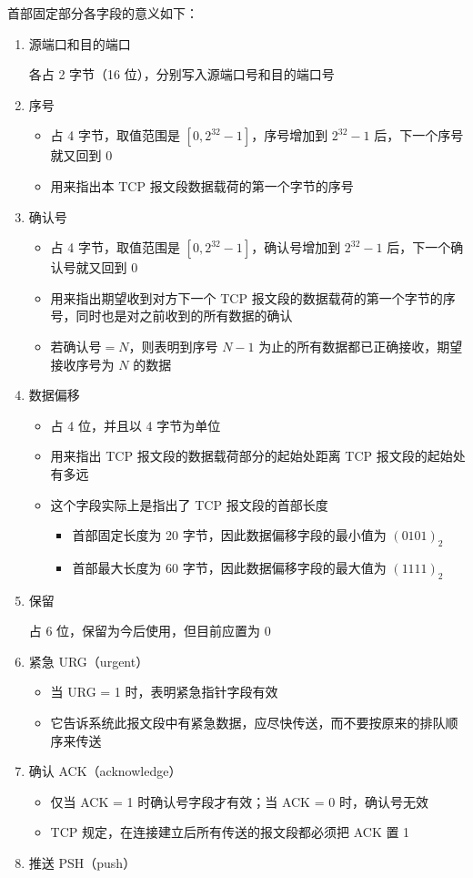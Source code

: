 \documentclass[cs4size,a4paper,10pt]{ctexart}
\begin{document}
	首部固定部分各字段的意义如下：
	\begin{enumerate}[label=\arabic*.]
		\item 源端口和目的端口
		
		各占 2 字节（16 位），分别写入源端口号和目的端口号
		\item 序号
		\begin{itemize}
			\item 占 4 字节，取值范围是 $[0,2^{32} - 1]$，序号增加到 $2^{32}-1$ 后，下一个序号就又回到 0
			\item 用来指出本 TCP 报文段数据载荷的第一个字节的序号
		\end{itemize}
		\item 确认号
		\begin{itemize}
			\item 占 4 字节，取值范围是 $[0,2^{32} - 1]$，确认号增加到 $2^{32}-1$ 后，下一个确认号就又回到 0
			\item 用来指出期望收到对方下一个 TCP 报文段的数据载荷的第一个字节的序号，同时也是对之前收到的所有数据的确认
			\item 若确认号$=N$，则表明到序号 $N-1$ 为止的所有数据都已正确接收，期望接收序号为 $N$ 的数据
		\end{itemize}
		\item 数据偏移
		\begin{itemize}
			\item 占 4 位，并且以 4 字节为单位
			\item 用来指出 TCP 报文段的数据载荷部分的起始处距离 TCP 报文段的起始处有多远
			\item 这个字段实际上是指出了 TCP 报文段的首部长度
			\begin{itemize}
				\item 首部固定长度为 20 字节，因此数据偏移字段的最小值为 $(0101)_2$
				\item 首部最大长度为 60 字节，因此数据偏移字段的最大值为 $(1111)_2$
			\end{itemize}
		\end{itemize}
		\item 保留
		
		占 6 位，保留为今后使用，但目前应置为 0
		\item 紧急 URG（urgent）
		\begin{itemize}
			\item 当 URG = 1 时，表明紧急指针字段有效
			\item 它告诉系统此报文段中有紧急数据，应尽快传送，而不要按原来的排队顺序来传送
		\end{itemize}
		\item 确认 ACK（acknowledge）
		\begin{itemize}
			\item 仅当 ACK = 1 时确认号字段才有效；当 ACK = 0 时，确认号无效
			\item TCP 规定，在连接建立后所有传送的报文段都必须把 ACK 置 1
		\end{itemize}
		\item 推送 PSH（push）
		

\end{enumerate}
\end{document}
